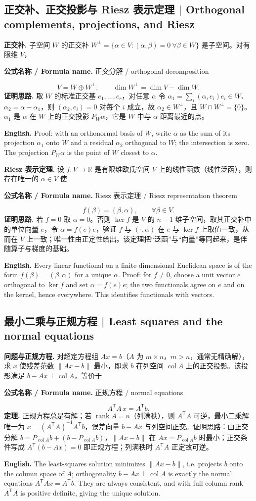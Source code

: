 \documentclass[UTF8,11pt,a4paper]{ctexart}
\newcommand{\EN}[1]{\par\noindent\textbf{English.} #1\par}
\newcommand{\FORMULA}[2]{\par\noindent\textbf{公式名称 / Formula name.} #1 / #2\par}
\begin{document}
\subsection{正交补、正交投影与 Riesz 表示定理 | Orthogonal complements, projections, and Riesz}
\noindent\textbf{正交补.} 子空间 $W$ 的正交补 $W^\perp=\{\alpha\in V:(\alpha,\beta)=0\ \forall\beta\in W\}$ 是子空间。对有限维 $V$，
\FORMULA{正交分解}{orthogonal decomposition}
\[
V=W\oplus W^\perp,\qquad \dim W^\perp=\dim V-\dim W.
\]
\noindent\textbf{证明思路.} 取 $W$ 的标准正交基 $e_1,\dots,e_r$，对任意 $\alpha$ 令 $\alpha_1=\sum_i(\alpha,e_i)e_i\in W$、$\alpha_2=\alpha-\alpha_1$，则 $(\alpha_2,e_i)=0$ 对每个 $i$ 成立，故 $\alpha_2\in W^\perp$，且 $W\cap W^\perp=\{0\}$。$\alpha_1$ 是 $\alpha$ 在 $W$ 上的正交投影 $P_W\alpha$，它是 $W$ 中与 $\alpha$ 距离最近的点。
\EN{Proof: with an orthonormal basis of $W$, write $\alpha$ as the sum of its projection $\alpha_1$ onto $W$ and a residual $\alpha_2$ orthogonal to $W$; the intersection is zero. The projection $P_W\alpha$ is the point of $W$ closest to $\alpha$.}
\noindent\textbf{Riesz 表示定理.} 设 $f:V\to\mathbb R$ 是有限维欧氏空间 $V$ 上的线性函数（线性泛函），则存在唯一的 $\alpha\in V$ 使
\FORMULA{Riesz 表示定理}{Riesz representation theorem}
\[
f(\beta)=(\beta,\alpha),\qquad \forall\beta\in V.
\]
\noindent\textbf{证明思路.} 若 $f=0$ 取 $\alpha=0$。否则 $\ker f$ 是 $V$ 的 $n-1$ 维子空间，取其正交补中的单位向量 $e$，令 $\alpha=f(e)e$，验证 $f$ 与 $(\cdot,\alpha)$ 在 $e$ 与 $\ker f$ 上取值一致，从而在 $V$ 上一致；唯一性由正定性给出。该定理把“泛函”与“向量”等同起来，是伴随算子与梯度的基础。
\EN{Every linear functional on a finite-dimensional Euclidean space is of the form $f(\beta)=(\beta,\alpha)$ for a unique $\alpha$. Proof: for $f\ne0$, choose a unit vector $e$ orthogonal to $\ker f$ and set $\alpha=f(e)e$; the two functionals agree on $e$ and on the kernel, hence everywhere. This identifies functionals with vectors.}

\subsection{最小二乘与正规方程 | Least squares and the normal equations}
\noindent\textbf{问题与正规方程.} 对超定方程组 $Ax=b$（$A$ 为 $m\times n$，$m>n$，通常无精确解），求 $x$ 使残差范数 $\|Ax-b\|$ 最小，即求 $b$ 在列空间 $\operatorname{col}A$ 上的正交投影。该投影满足 $b-Ax\perp\operatorname{col}A$，等价于
\FORMULA{正规方程}{normal equations}
\[
A^{\mathsf T}A\,x=A^{\mathsf T}b.
\]
\noindent\textbf{定理.} 正规方程总是有解；若 $\operatorname{rank}A=n$（列满秩），则 $A^{\mathsf T}A$ 可逆，最小二乘解唯一为 $x=(A^{\mathsf T}A)^{-1}A^{\mathsf T}b$，误差向量 $b-Ax$ 与列空间正交。证明思路：由正交分解 $b=P_{\operatorname{col}A}b+(b-P_{\operatorname{col}A}b)$，$\|Ax-b\|$ 在 $Ax=P_{\operatorname{col}A}b$ 时最小；正交条件写成 $A^{\mathsf T}(b-Ax)=0$ 即正规方程；列满秩时 $A^{\mathsf T}A$ 正定故可逆。
\EN{The least-squares solution minimizes $\|Ax-b\|$, i.e. projects $b$ onto the column space of $A$; orthogonality $b-Ax\perp\operatorname{col}A$ is exactly the normal equations $A^{\mathsf T}Ax=A^{\mathsf T}b$. They are always consistent, and with full column rank $A^{\mathsf T}A$ is positive definite, giving the unique solution.}
\end{document}
